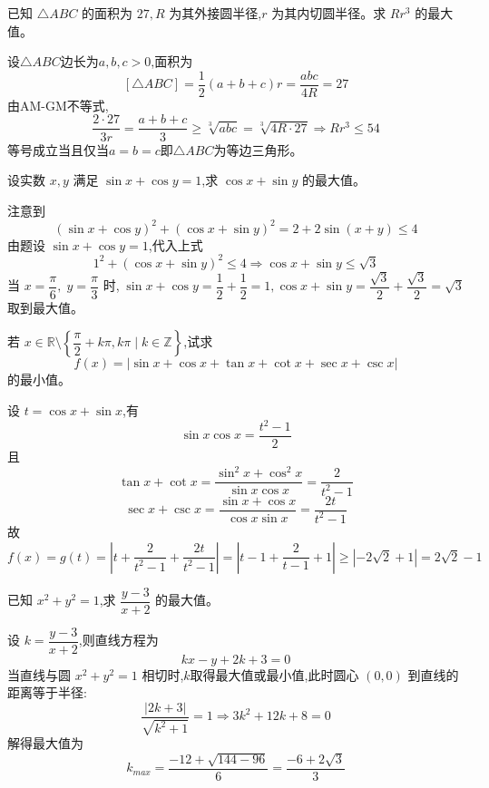 \begin{questions}
    \question 已知 $\triangle ABC$ 的面积为 $27,R$ 为其外接圆半径,$r$ 为其内切圆半径。求 $Rr^{3}$ 的最大值。
    \begin{solution}
        设$\triangle ABC$边长为$a,b,c>0$,面积为
        \[
        [\triangle ABC]=\frac{1}{2}(a+b+c)r=\frac{abc}{4R}=27
        \]
        由AM-GM不等式,
        \[
        \frac{2\cdot27}{3r}=\frac{a+b+c}{3}\ge \sqrt[3]{abc} = \sqrt[3]{4R\cdot 27} \Rightarrow Rr^3 \le 54
        \]
        等号成立当且仅当$a=b=c$即$\triangle ABC$为等边三角形。
    \end{solution}

    \question 设实数 $x,y$ 满足 $\sin x + \cos y = 1$,求 $\cos x + \sin y$ 的最大值。
    \begin{solution}
        注意到
        \[
        (\sin x + \cos y)^2 + (\cos x + \sin y)^2 = 2 + 2\sin(x + y) \le 4
        \]
        由题设 $\sin x + \cos y = 1$,代入上式
        \[
        1^2 + (\cos x + \sin y)^2 \le 4 
        \Rightarrow \cos x + \sin y \le \sqrt{3}
        \]
        当 $x = \dfrac{\pi}{6},\; y = \dfrac{\pi}{3}$ 时,$\;\sin x + \cos y = \dfrac{1}{2} + \dfrac{1}{2} = 1,\cos x + \sin y = \dfrac{\sqrt{3}}{2} + \dfrac{\sqrt{3}}{2} = \sqrt{3}$ 取到最大值。
    \end{solution}

    \question 若 $x \in \mathbb{R} \setminus \left\{\dfrac{\pi}{2} + k\pi, k\pi \mid k \in \mathbb{Z} \right\}$,试求 
    \[
    f(x) = |\sin x + \cos x + \tan x + \cot x + \sec x + \csc x|
    \]
    的最小值。
    \begin{solution}
        设 $t = \cos x + \sin x $,有
        \[
        \sin x\cos x = \frac{t^2 - 1}{2}
        \]
        且
        \[
        \tan x + \cot x = \frac{\sin^2 x+\cos^2 x}{\sin x \cos x} = \frac{2}{t^2 - 1} 
        \]
        \[
        \sec x + \csc x = \frac{\sin x + \cos x}{\cos x \sin x} = \frac{2t}{t^2 - 1}
        \]
        故
        \[
        f(x) = g(t) = \left| t + \frac{2}{t^2 - 1} + \frac{2t}{t^2 - 1} \right| = \left| t - 1 + \frac{2}{t - 1} + 1 \right| \ge \left| -2\sqrt{2} + 1 \right| = 2\sqrt{2} - 1
        \]
    \end{solution}

    \question 已知 $x^2 + y^2 = 1$,求 $\dfrac{y-3}{x+2}$ 的最大值。
    \begin{solution}
        设 $k = \dfrac{y-3}{x+2}$,则直线方程为 
        \[
        kx - y + 2k + 3 = 0
        \]
        当直线与圆 $x^2 + y^2 = 1$ 相切时,$k$取得最大值或最小值,此时圆心 $(0,0)$ 到直线的距离等于半径:
        \[ 
        \frac{|2k+3|}{\sqrt{k^2+1}} = 1 \Rightarrow 3k^2 + 12k + 8 = 0 
        \]
        解得最大值为 
        \[
        k_{max} = \frac{-12 + \sqrt{144 - 96}}{6} =  \frac{-6 + 2\sqrt{3}}{3}
        \]
    \end{solution}


\end{questions}
